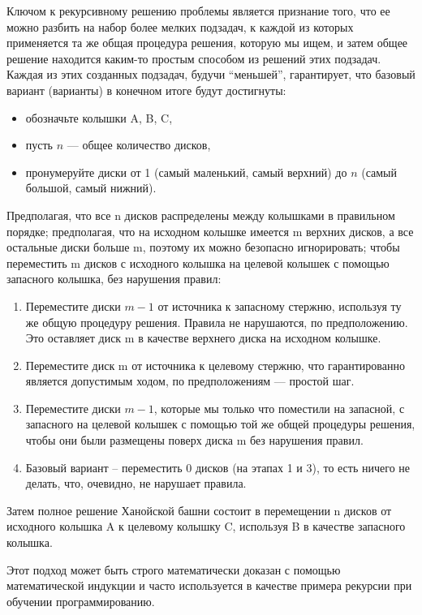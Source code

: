 Ключом к рекурсивному решению проблемы является признание того, что ее можно
разбить на набор более мелких подзадач, к каждой из которых применяется та же
общая процедура решения, которую мы ищем, и затем общее решение находится
каким-то простым способом из решений этих подзадач. Каждая из этих созданных
подзадач, будучи ``меньшей'', гарантирует, что базовый вариант (варианты) в
конечном итоге будут достигнуты:

\begin{itemize}
	\item обозначьте колышки A, B, C,
	\item пусть $n$ --- общее количество дисков,
	\item пронумеруйте диски от 1 (самый маленький, самый верхний) до $n$ (самый
	      большой, самый нижний).
\end{itemize}

Предполагая, что все n дисков распределены между колышками в правильном
порядке; предполагая, что на исходном колышке имеется m верхних дисков, а все
остальные диски больше m, поэтому их можно безопасно игнорировать; чтобы
переместить m дисков с исходного колышка на целевой колышек с помощью запасного
колышка, без нарушения правил:

\begin{enumerate}
	\item Переместите диски $m - 1$ от источника к запасному стержню, используя ту
	      же общую процедуру решения. Правила не нарушаются, по предположению. Это
	      оставляет диск m в качестве верхнего диска на исходном колышке.
	\item Переместите диск m от источника к целевому стержню, что гарантированно
	      является допустимым ходом, по предположениям — простой шаг.
	\item Переместите диски $m - 1$, которые мы только что поместили на запасной, с
	      запасного на целевой колышек с помощью той же общей процедуры решения,
	      чтобы они были размещены поверх диска m без нарушения правил.
	\item Базовый вариант – переместить 0 дисков (на этапах 1 и 3), то есть
	      ничего не делать, что, очевидно, не нарушает правила.
\end{enumerate}

Затем полное решение Ханойской башни состоит в перемещении n дисков от
исходного колышка A к целевому колышку C, используя B в качестве запасного
колышка.

Этот подход может быть строго математически доказан с помощью математической
индукции и часто используется в качестве примера рекурсии при обучении
программированию.

